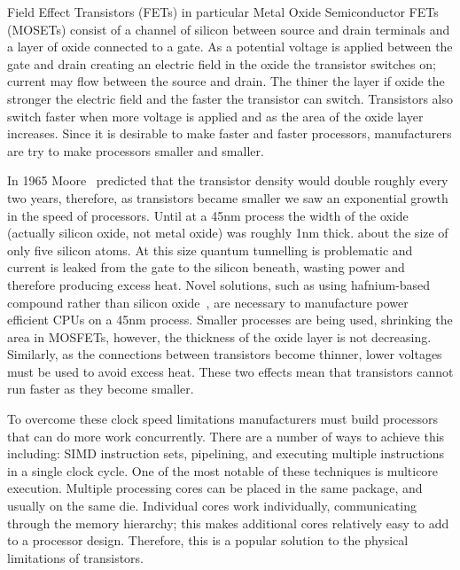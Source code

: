 %
%



Field Effect Transistors (FETs) in particular Metal Oxide Semiconductor FETs
(MOSETs) consist of a channel of silicon between source and drain terminals and
a layer of oxide connected to a gate.
As a potential voltage is applied between the gate and drain creating an
electric field in the oxide
the transistor switches on;
current may flow between the source and drain.
The thiner the layer if oxide the stronger the electric field and the faster
the transistor can switch.
Transistors also switch faster when more voltage is applied
and as the area of the oxide layer increases.
Since it is desirable to make faster and faster processors,
manufacturers are try to make processors smaller and smaller.

In 1965 Moore~\cite{moore} predicted that the transistor 
density would double roughly every two years,
therefore, as transistors became smaller we saw an
exponential growth in the speed of processors.
Until at a 45nm process the width of the oxide
(actually silicon oxide, not metal oxide)
was roughly 1nm thick.
about the size of only five silicon atoms.
At this size quantum tunnelling is problematic and current is leaked from the
gate to the silicon beneath,
wasting power and therefore producing excess heat.
Novel solutions,
such as using hafnium-based compound rather than silicon
oxide~\cite{intel-high-k},
are necessary to manufacture power efficient CPUs on a 45nm process.
Smaller processes are being used, shrinking the area in MOSFETs,
however, the thickness of the oxide layer is not decreasing.
Similarly, as the connections between transistors become thinner,
lower voltages must be used to avoid excess heat.
These two effects mean that transistors cannot run faster as they become
smaller.

To overcome these clock speed limitations manufacturers must build processors
that can do more work concurrently.
There are a number of ways to achieve this including:
SIMD instruction sets,
pipelining,
and executing multiple instructions in a single clock cycle.
One of the most notable of these techniques is multicore execution.
Multiple processing cores can be placed in the same package,
and usually on the same die.
Individual cores work individually, communicating through the memory
hierarchy;
this makes additional cores relatively easy to add to a processor design.
Therefore, this is a popular solution to the physical limitations of
transistors.


